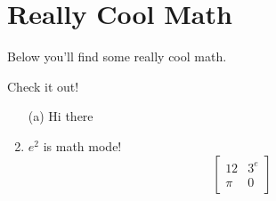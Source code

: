 \section*{Really Cool Math}
Below you'll find some really cool math.

Check it out!
\begin{enumerate}
	\item[(a)] Hi there

	\item $e^{2}$ is math mode!
		\[
			\begin{bmatrix}
				12  & 3^{e} \\
				\pi & 0
			\end{bmatrix}
		\]
\end{enumerate}